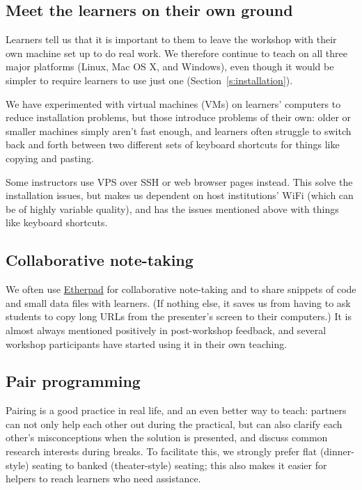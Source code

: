 \documentclass[10pt,a4paper,twocolumn]{article}
\begin{document}
\subsection{Meet the learners on their own ground}

Learners tell us that it is important to them to leave the workshop
with their own machine set up to do real work.  We therefore continue
to teach on all three major platforms (Linux, Mac OS X, and Windows),
even though it would be simpler to require learners to use just one
(Section~\ref{s:installation}).

We have experimented with virtual machines (VMs) on learners'
computers to reduce installation problems, but those introduce
problems of their own: older or smaller machines simply aren't fast
enough, and learners often struggle to switch back and forth between
two different sets of keyboard shortcuts for things like copying and
pasting.

Some instructors use VPS over SSH or web browser pages instead.  This
solve the installation issues, but makes us dependent on host
institutions' WiFi (which can be of highly variable quality), and
has the issues mentioned above with things like keyboard shortcuts.

\subsection{Collaborative note-taking}\label{s:etherpad}

We often use \href{http://etherpad.org}{Etherpad} for collaborative
note-taking and to share snippets of code and small data files with
learners. (If nothing else, it saves us from having to ask students to
copy long URLs from the presenter's screen to their computers.) It is
almost always mentioned positively in post-workshop feedback, and
several workshop participants have started using it in their own
teaching.

\subsection{Pair programming}

Pairing is a good practice in real life, and an even better way to
teach: partners can not only help each other out during the practical,
but can also clarify each other's misconceptions when the solution is
presented, and discuss common research interests during breaks. To
facilitate this, we strongly prefer flat (dinner-style) seating to
banked (theater-style) seating; this also makes it easier for helpers
to reach learners who need assistance.
\end{document}
